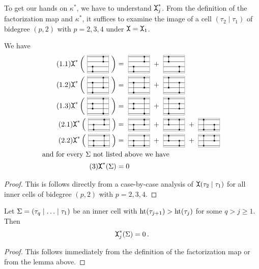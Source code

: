 To get our hands on $\kappa^\ast$, we have to understand $\mueta_j^\ast$.
From the definition of the factorization map and $\kappa^\ast$,
it suffices to examine the image of a cell $(\tau_2 \mid \tau_1)$ of bidegree $(p,2)$ with $p = 2,3,4$ under $\mueta = \mueta_1$.

\begin{lem}
    \label{cellular_models:dual_ehrenfried:f_dual_of_a_cell}
    We have
    \begin{align}
        \tag{1.1} \mueta^\ast \left( \vierzweizelle{2}{1}{4}{3} \right) & = \vierzweizelle{2}{1}{4}{3} + \vierzweizelle{4}{3}{2}{1} \\
        \tag{1.2} \mueta^\ast \left( \vierzweizelle{3}{1}{4}{2} \right) & = \vierzweizelle{3}{1}{4}{2} + \vierzweizelle{4}{2}{3}{1} \\
        \tag{1.3} \mueta^\ast \left( \vierzweizelle{3}{2}{4}{1} \right) & = \vierzweizelle{3}{2}{4}{1} + \vierzweizelle{4}{1}{3}{2} \\
        \tag{2.1} \mueta^\ast \left( \dreizweizelle{2}{1}{3}{2} \right) & = \dreizweizelle{2}{1}{3}{2} + \dreizweizelle{3}{2}{3}{1} + \dreizweizelle{3}{1}{2}{1} \\
        \tag{2.2} \mueta^\ast \left( \dreizweizelle{2}{1}{3}{1} \right) & = \dreizweizelle{2}{1}{3}{1} + \dreizweizelle{3}{2}{2}{1} + \dreizweizelle{3}{1}{3}{2} \\
        \intertext{and for every $\Sigma$ not listed above we have}
        \tag{3}   \mueta^\ast (\Sigma) &= 0
    \end{align}
\end{lem}

\begin{proof}
    This is follows directly from a case-by-case analysis of $\mueta(\tau_2 \mid \tau_1)$ for all inner cells of bidegree $(p,2)$ with $p = 2,3,4$.
\end{proof}

\begin{lem}
    \label{cellular_models:dual_ehrenfried:f_dual_vanishes_at_monotonous_spot}
    Let $\Sigma = \inhomq$ be an inner cell with $\operatorname{ht}(\tau_{j+1}) > \operatorname{ht}(\tau_j)$ for some $q > j \ge 1$.
    Then
    \[
        \mueta^\ast_j(\Sigma) = 0 \,.
    \]
\end{lem}

\begin{proof}
    This follows immediately from the definition of the factorization map or from the lemma above.
\end{proof}

